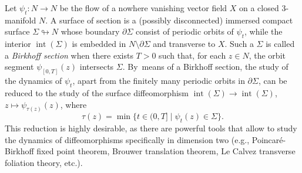 \documentclass[11pt]{article}
\newcommand{\eg}{e.g.,\xspace}
\let\sep\mid
\DeclareMathOperator{\interior}{int}
\theoremstyle{plain}
\theoremstyle{definition}
\begin{document}
Let $\psi_t:N\to N$ be the flow of a nowhere vanishing vector field $X$ on a closed 3-manifold $N$. A surface of section is a (possibly disconnected) immersed compact surface $\Sigma \looparrowright N$ whose boundary $\partial \Sigma$ consist of periodic orbits of $\psi_t$, while the interior $\interior(\Sigma)$ is embedded in $N \setminus \partial \Sigma$ and transverse to $X$. Such a $\Sigma$ is called a \emph{Birkhoff section} when there exists $T>0$ such that, for each $z\in N$, the orbit segment $\psi_{[0,T]}(z)$ intersects $\Sigma$. By~means of a Birkhoff section, the study of the dynamics of $\psi_t$, apart from the finitely many periodic orbits in $\partial\Sigma$, can be reduced to the study of the surface diffeomorphism $\interior(\Sigma)\to\interior(\Sigma)$, $z\mapsto\psi_{\tau(z)}(z)$, where\vspace*{-3pt}
\[
\tau(z)=\min\big\{t\in(0,T]\sep \psi_t(z)\in\Sigma \big\}.
\]
This reduction is highly desirable, as there are powerful tools that allow to study the dynamics of diffeomorphisms specifically in dimension two (\eg Poincaré-Birkhoff fixed point theorem, Brouwer translation theorem, Le Calvez transverse foliation theory, etc.).
\end{document}
